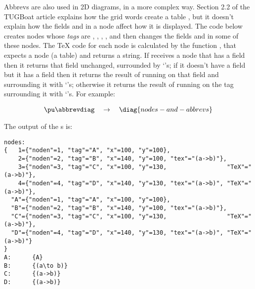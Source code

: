 \documentclass[oneside]{article}
\begin{document}
Abbrevs are also used in 2D diagrams, in a more complex way. Section
2.2 of the TUGBoat article explains how the grid words create a table
, but it doesn't explain how the fields  and
 in a node affect how it is displayed. The code below creates
nodes whose {\sl tags} are , , , , and
then changes the fields  and  in some of these
nodes. The \TeX{} code for each node is calculated by the function
, that expects a node (a table) and returns a
string. If  receives a node that has a 
field then it returns that field unchanged, surrounded by
`\co{\{\}}'s; if it doesn't have a  field but it has a
 field then it returns the result of running  on
that field and surrounding it with `\co{\{\}}'s; otherwise it returns
the result of running  on the tag surrounding it with
`\co{\{\}}'s. For example:


$$\pu
  \myvcenter{\abbrevdiag}
  \quad
  \to
  \quad
  \diag{nodes-and-abbrevs}
$$

The output of the s is:

{\footnotesize
\begin{verbatim}
nodes:
{   1={"noden"=1, "tag"="A", "x"=100, "y"=100},
    2={"noden"=2, "tag"="B", "x"=140, "y"=100, "tex"="(a->b)"},
    3={"noden"=3, "tag"="C", "x"=100, "y"=130,                 "TeX"="(a->b)"},
    4={"noden"=4, "tag"="D", "x"=140, "y"=130, "tex"="(a->b)", "TeX"="(a->b)"},
  "A"={"noden"=1, "tag"="A", "x"=100, "y"=100},
  "B"={"noden"=2, "tag"="B", "x"=140, "y"=100, "tex"="(a->b)"},
  "C"={"noden"=3, "tag"="C", "x"=100, "y"=130,                 "TeX"="(a->b)"},
  "D"={"noden"=4, "tag"="D", "x"=140, "y"=130, "tex"="(a->b)", "TeX"="(a->b)"}
}
A:      {A}
B:      {(a\to b)}
C:      {(a->b)}
D:      {(a->b)}
\end{verbatim}
}
\end{document}
